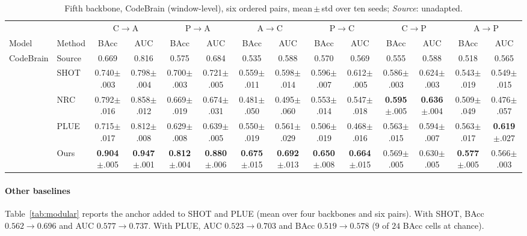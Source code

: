 \documentclass[letterpaper]{article} %
\begin{document}
\begin{table}[!t]
    \centering
    \setlength{\tabcolsep}{1.2pt}
    \renewcommand{\arraystretch}{1.1}
    \begin{tabular}{ll cc cc cc cc cc cc}
    \toprule
    & & \multicolumn{2}{c}{C$\to$A} & \multicolumn{2}{c}{P$\to$A} & \multicolumn{2}{c}{A$\to$C} & \multicolumn{2}{c}{P$\to$C} & \multicolumn{2}{c}{C$\to$P} & \multicolumn{2}{c}{A$\to$P} \\
    \cmidrule(lr){3-4}\cmidrule(lr){5-6}\cmidrule(lr){7-8}\cmidrule(lr){9-10}\cmidrule(lr){11-12}\cmidrule(lr){13-14}
    Model & Method & BAcc & AUC & BAcc & AUC & BAcc & AUC & BAcc & AUC & BAcc & AUC & BAcc & AUC \\
    \midrule
    CodeBrain & Source & 0.669 & 0.816 & 0.575 & 0.684 & 0.535 & 0.588 & 0.570 & 0.569 & 0.555 & 0.588 & 0.518 & 0.565 \\
     & SHOT & 0.740{$\pm$.003} & 0.798{$\pm$.004} & 0.700{$\pm$.003} & 0.721{$\pm$.005} & 0.559{$\pm$.011} & 0.598{$\pm$.014} & 0.596{$\pm$.007} & 0.612{$\pm$.005} & 0.586{$\pm$.003} & 0.624{$\pm$.003} & 0.543{$\pm$.019} & 0.549{$\pm$.015} \\
     & NRC & 0.792{$\pm$.016} & 0.858{$\pm$.012} & 0.669{$\pm$.019} & 0.674{$\pm$.031} & 0.481{$\pm$.050} & 0.495{$\pm$.060} & 0.553{$\pm$.014} & 0.547{$\pm$.018} & \textbf{0.595}{$\pm$.005} & \textbf{0.636}{$\pm$.004} & 0.509{$\pm$.049} & 0.476{$\pm$.057} \\
     & PLUE & 0.715{$\pm$.017} & 0.812{$\pm$.008} & 0.629{$\pm$.008} & 0.639{$\pm$.005} & 0.550{$\pm$.019} & 0.561{$\pm$.029} & 0.506{$\pm$.019} & 0.468{$\pm$.016} & 0.563{$\pm$.015} & 0.594{$\pm$.007} & 0.563{$\pm$.017} & \textbf{0.619}{$\pm$.027} \\
     & Ours & \textbf{0.904}{$\pm$.005} & \textbf{0.947}{$\pm$.001} & \textbf{0.812}{$\pm$.004} & \textbf{0.880}{$\pm$.006} & \textbf{0.675}{$\pm$.015} & \textbf{0.692}{$\pm$.013} & \textbf{0.650}{$\pm$.008} & \textbf{0.664}{$\pm$.015} & 0.569{$\pm$.005} & 0.630{$\pm$.005} & \textbf{0.577}{$\pm$.005} & 0.566{$\pm$.003} \\
    \bottomrule\end{tabular}
    \caption{Fifth backbone, CodeBrain (window-level), six ordered pairs,
    mean\,$\pm$\,std over ten seeds; \emph{Source}: unadapted.}
    \label{tab:codebrain}
    \end{table}
    
    
    
    
\paragraph{Other baselines} Table~\ref{tab:modular} reports the anchor added to SHOT and PLUE (mean over four backbones and six pairs). With SHOT, BAcc $0.562{\to}0.696$ and AUC $0.577{\to}0.737$. With PLUE, AUC $0.523{\to}0.703$ and BAcc $0.519{\to}0.578$ ($9$ of $24$ BAcc cells at chance).
\end{document}
